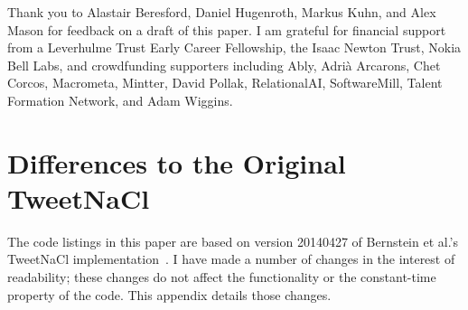 \documentclass[manuscript]{acmart}
\begin{document}




\begin{acks}
Thank you to Alastair Beresford, Daniel Hugenroth, Markus Kuhn, and Alex Mason for feedback on a draft of this paper.
I am grateful for financial support from a Leverhulme Trust Early Career Fellowship, the Isaac Newton Trust, Nokia Bell Labs, and crowdfunding supporters including Ably, Adri{\` a} Arcarons, Chet Corcos, Macrometa, Mintter, David Pollak, RelationalAI, SoftwareMill, Talent Formation Network, and Adam Wiggins.
\end{acks}




\appendix
\section{Differences to the Original TweetNaCl}\label{sec:appendix}

The code listings in this paper are based on version 20140427 of Bernstein et al.'s TweetNaCl implementation~\cite{TweetNaCl}.
I have made a number of changes in the interest of readability; these changes do not affect the functionality or the constant-time property of the code.
This appendix details those changes.
\end{document}
